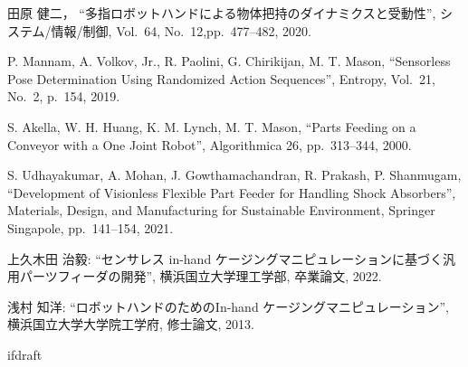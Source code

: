 \documentclass[a4paper,twoside,12pt,papersize, dvipdfmx]{iirthesis}
\begin{document}
\begin{thebibliography}{}
    	田原 健二，
  	``多指ロボットハンドによる物体把持のダイナミクスと受動性'',
  	 システム/情報/制御,
  	 Vol.~64, No.~12,pp.~477--482,
  	2020. 
  	
  	P. Mannam, A. Volkov, Jr., R. Paolini, G. Chirikijan, M. T. Mason,
  	``Sensorless Pose Determination Using Randomized Action Sequences'',
  	 Entropy, Vol.~21, No.~2, p.~154, 
  	2019.
  	
  	S. Akella, W. H. Huang, K. M. Lynch, M. T. Mason,
  	``Parts Feeding on a Conveyor with a One Joint Robot'',
  	 Algorithmica 26,
  	 pp.~313--344,
  	2000.
  	
  	S. Udhayakumar, A. Mohan, J. Gowthamachandran,  R. Prakash, P. Shanmugam,
  	``Development of Visionless Flexible Part Feeder for Handling Shock Absorbers'',
  	 Materials, Design, and Manufacturing for Sustainable Environment, Springer Singapole, 
  	 pp.~141--154,
  	2021.  	
  	
上久木田 治毅:
``センサレス in-hand ケージングマニピュレーションに基づく汎用パーツフィーダの開発'', 
横浜国立大学理工学部, 卒業論文, 2022.
  	
浅村 知洋:
``ロボットハンドのためのIn-hand ケージングマニピュレーション'', 
横浜国立大学大学院工学府, 修士論文, 2013.
\end{thebibliography}

\expandafter\ifx\csname ifdraft\endcsname\relax
    
\end{document}
